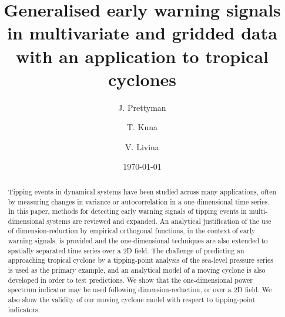 \documentclass[%
aip,
amsmath,amssymb,
reprint,%
]{revtex4-1}
\begin{document}
	
	
	\title[Generalised early warning signal methods]{Generalised early warning signals in multivariate and gridded data with an application to tropical cyclones}
	
	\author{J. Prettyman}
	\author{T. Kuna}%
	\author{V. Livina}
	
	\date{\today}%







\begin{abstract}
Tipping events in dynamical systems have been studied across many applications, often by measuring changes in variance or autocorrelation in a one-dimensional time series. In this paper, methods for detecting early warning signals of tipping events in multi-dimensional systems are reviewed and expanded. An analytical justification of the use of dimension-reduction by empirical orthogonal functions, in the context of early warning signals, is provided and the one-dimensional techniques are also extended to spatially separated time series over a 2D field. The challenge of predicting an approaching tropical cyclone by a tipping-point analysis of the sea-level pressure series is used as the primary example, and an analytical model of a moving cyclone is also developed in order to test predictions. We show that the one-dimensional power spectrum indicator may be used following dimension-reduction, or over a 2D field. We also show the validity of our moving cyclone model with respect to tipping-point indicators.
\end{abstract}

\pacs{}

\maketitle
\end{document}
